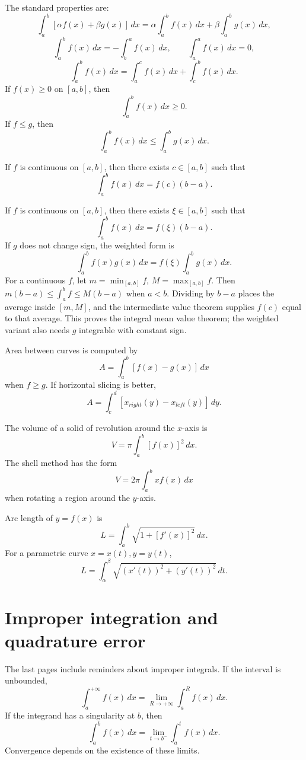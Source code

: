 The standard properties are:
\[
  \int_a^b [\alpha f(x)+\beta g(x)]\,dx
  =
  \alpha\int_a^b f(x)\,dx+\beta\int_a^b g(x)\,dx,
\]
\[
  \int_a^b f(x)\,dx=-\int_b^a f(x)\,dx,\qquad
  \int_a^a f(x)\,dx=0,
\]
\[
  \int_a^b f(x)\,dx=\int_a^c f(x)\,dx+\int_c^b f(x)\,dx.
\]
If $f(x)\ge0$ on $[a,b]$, then
\[
  \int_a^b f(x)\,dx\ge0.
\]
If $f\le g$, then
\[
  \int_a^b f(x)\,dx\le\int_a^b g(x)\,dx.
\]

\begin{theorem}
If \(f\) is continuous on \([a,b]\), then there exists \(c\in[a,b]\) such that
\[
  \int_a^b f(x)\,dx=f(c)(b-a).
\]
\end{theorem}


If $f$ is continuous on $[a,b]$, then there exists $\xi\in[a,b]$ such that
\[
  \int_a^b f(x)\,dx=f(\xi)(b-a).
\]
If $g$ does not change sign, the weighted form is
\[
  \int_a^b f(x)g(x)\,dx
  =
  f(\xi)\int_a^b g(x)\,dx.
\]
For a continuous \(f\), let \(m=\min_{[a,b]}f\), \(M=\max_{[a,b]}f\). Then \(m(b-a)\le\int_a^b f\le M(b-a)\) when \(a<b\). Dividing by \(b-a\) places the average inside \([m,M]\), and the intermediate value theorem supplies \(f(c)\) equal to that average. This proves the integral mean value theorem; the weighted variant also needs \(g\) integrable with constant sign.

Area between curves is computed by
\[
  A=\int_a^b [f(x)-g(x)]\,dx
\]
when $f\ge g$.  If horizontal slicing is better,
\[
  A=\int_c^d [x_{right}(y)-x_{left}(y)]\,dy.
\]

The volume of a solid of revolution around the $x$-axis is
\[
  V=\pi\int_a^b [f(x)]^2\,dx.
\]
The shell method has the form
\[
  V=2\pi\int_a^b x f(x)\,dx
\]
when rotating a region around the $y$-axis.

Arc length of $y=f(x)$ is
\[
  L=\int_a^b \sqrt{1+[f'(x)]^2}\,dx.
\]
For a parametric curve $x=x(t),y=y(t)$,
\[
  L=\int_\alpha^\beta
  \sqrt{(x'(t))^2+(y'(t))^2}\,dt.
\]

\section{Improper integration and quadrature error}

The last pages include reminders about improper integrals.  If the interval is unbounded,
\[
  \int_a^{+\infty}f(x)\,dx
  =
  \lim_{R\to+\infty}\int_a^R f(x)\,dx.
\]
If the integrand has a singularity at $b$, then
\[
  \int_a^b f(x)\,dx
  =
  \lim_{t\to b^-}\int_a^t f(x)\,dx.
\]
Convergence depends on the existence of these limits.

